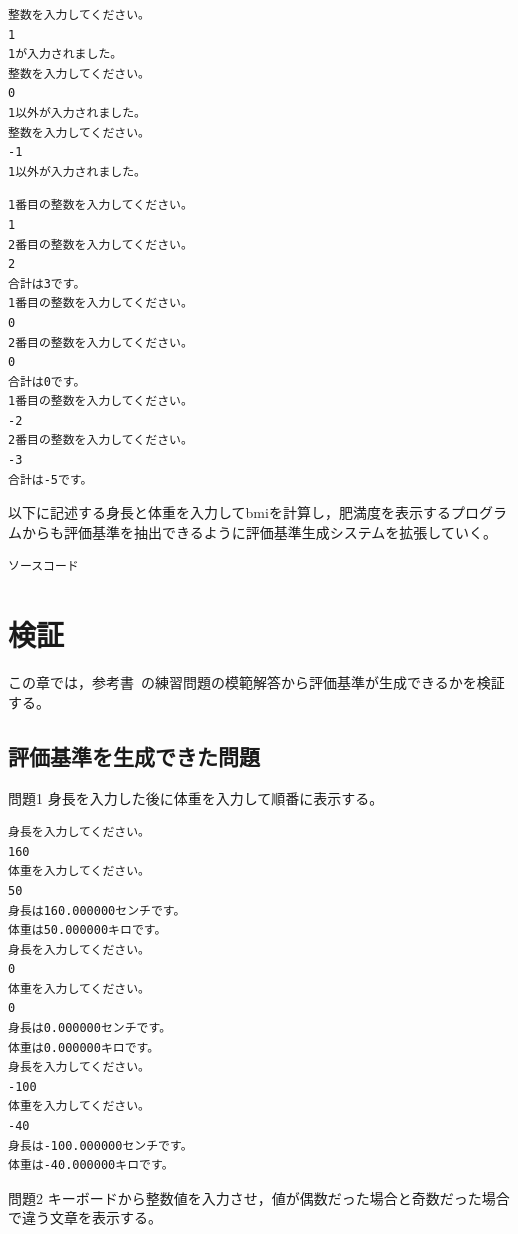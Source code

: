 \documentclass{tpu-sotu}
\begin{document}



\begin{lstlisting}[xleftmargin=1cm]
整数を入力してください。
1
1が入力されました。
整数を入力してください。
0
1以外が入力されました。
整数を入力してください。
-1
1以外が入力されました。
\end{lstlisting}



\begin{lstlisting}[xleftmargin=1cm]
1番目の整数を入力してください。
1
2番目の整数を入力してください。
2
合計は3です。
1番目の整数を入力してください。
0
2番目の整数を入力してください。
0
合計は0です。
1番目の整数を入力してください。
-2
2番目の整数を入力してください。
-3
合計は-5です。
\end{lstlisting}

以下に記述する身長と体重を入力してbmiを計算し，肥満度を表示するプログラムからも評価基準を抽出できるように評価基準生成システムを拡張していく。


\begin{lstlisting}[xleftmargin=1cm]
   ソースコード
\end{lstlisting}
\chapter{検証}
この章では，参考書~\cite{b1}の練習問題の模範解答から評価基準が生成できるかを検証する。
\section{評価基準を生成できた問題}
\begin{itembox}[l]{問題1}
身長を入力した後に体重を入力して順番に表示する。
\end{itembox}



\begin{lstlisting}[xleftmargin=1cm]
身長を入力してください。
160
体重を入力してください。
50
身長は160.000000センチです。
体重は50.000000キロです。
身長を入力してください。
0
体重を入力してください。
0
身長は0.000000センチです。
体重は0.000000キロです。
身長を入力してください。
-100
体重を入力してください。
-40
身長は-100.000000センチです。
体重は-40.000000キロです。
\end{lstlisting}
\begin{itembox}[l]{問題2}
キーボードから整数値を入力させ，値が偶数だった場合と奇数だった場合で違う文章を表示する。
\end{itembox}
\end{document}
